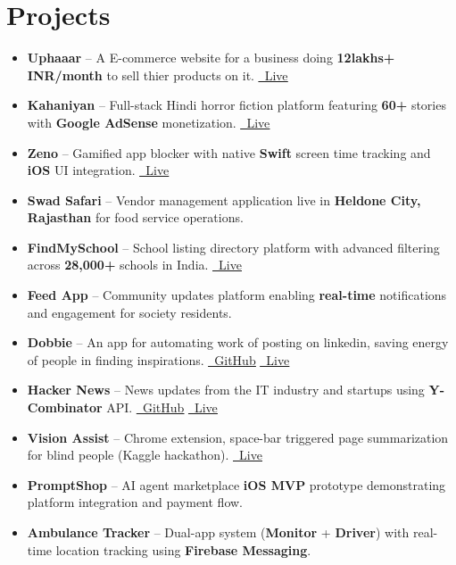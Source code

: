 \documentclass[a4paper,12pt]{article}
\begin{document}
\section*{Projects}
\vspace{1pt}
\begin{itemize}
\item \textbf{Uphaaar} – A E-commerce website for a business doing \textbf{12lakhs+ INR/month} to sell thier products on it.
\hfill
\href{https://uphaaar.vercel.app}{\scriptsize\underline{\faGlobe\ Live}}
\item \textbf{Kahaniyan} – Full-stack Hindi horror fiction platform featuring \textbf{60+} stories with \textbf{Google AdSense} monetization.
\hfill
\href{https://kahaniyan.page}{\scriptsize\underline{\faGlobe\ Live}}
\item \textbf{Zeno} – Gamified app blocker with native \textbf{Swift} screen time tracking and \textbf{iOS} UI integration.
\hfill
\href{https://zeno-sandy.vercel.app}{\scriptsize\underline{\faGlobe\ Live}}
\item \textbf{Swad Safari} – Vendor management application live in \textbf{Heldone City, Rajasthan} for food service operations.
\item \textbf{FindMySchool} – School listing directory platform with advanced filtering across \textbf{28,000+} schools in India.
\hfill
\href{https://findmyschool.co}{\scriptsize\underline{\faGlobe\ Live}}
\item \textbf{Feed App} – Community updates platform enabling \textbf{real-time} notifications and engagement for society residents.
\item \textbf{Dobbie} – An app for automating work of posting on linkedin, saving energy of people in finding inspirations.
\hfill
\hfill
\href{https://github.com/sagarrai21802/Dobbie.git}{\scriptsize\underline{\faGithub\ GitHub}}
\hspace{0pt}
\href{https://www.sagarrai.tech/projects/dobbie}{\scriptsize\underline{\faGlobe\ Live}}
\item \textbf{Hacker News} – News updates from the IT industry and startups using \textbf{Y-Combinator} API.
\hfill
\href{https://github.com/sagarrai21802/Hacker-News.git}{\scriptsize\underline{\faGithub\ GitHub}}
\hspace{0pt}
\href{https://www.sagarrai.tech/projects/hackernews}{\scriptsize\underline{\faGlobe\ Live}}
\item \textbf{Vision Assist} – Chrome extension, space-bar triggered page summarization for blind people (Kaggle hackathon).
\hfill
\href{https://sagarrai.tech/applications}{\scriptsize\underline{\faGlobe\ Live}}
\item \textbf{PromptShop} – AI agent marketplace \textbf{iOS MVP} prototype demonstrating platform integration and payment flow.
\item \textbf{Ambulance Tracker} – Dual-app system (\textbf{Monitor} + \textbf{Driver}) with real-time location tracking using \textbf{Firebase Messaging}.


\end{itemize}
\end{document}
